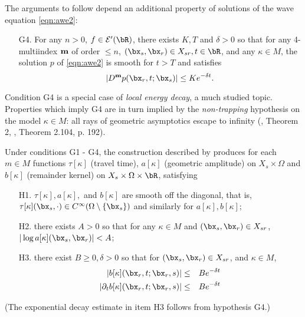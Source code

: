 The arguments to follow depend an additional property of solutions of
the wave equation \ref{eqn:awe2}:
\begin{itemize}
\item[G4. ] For any $n > 0$, $f \in {\cal E}'(\bR)$, there exists $K, T$ and $\delta>0$ so
  that for any 4-multiindex ${\bf m}$ of order $\le n$, $(\bx_s,\bx_r) \in
 X_{sr}, t \in \bR$,
  and any $\kappa \in M$, the solution $p$ of \ref{eqn:awe2} is smooth
  for $t>T$ and satisfies
  \[
    |D^{\bf m}p(\bx_r,t;\bx_s)| \le K e^{-\delta t}.
  \]
\end{itemize}
Condition G4 is a special case of {\em local energy decay}, a much
studied topic. Properties which imply G4 are in turn implied by the
{\em non-trapping} hypothesis on the model $\kappa \in M$: all rays of
geometric asymptotics escape to infinity (\cite{Hristova:09}, Theorem
2, \cite{EgorovShubin}, Theorem 2.104, p. 192).

Under conditions G1 - G4, the construction described by
\cite{Friedlander:75} produces for each $m \in M$ functions $\tau[\kappa]$ (travel time), $a[\kappa]$
(geometric amplitude) on $X_s \times \Omega$ and $b[\kappa]$
(remainder kernel) on $X_s \times \Omega \times \bR$, satisfying
\begin{itemize}
\item[H1. ] $\tau[\kappa], a[\kappa],$ and $b[\kappa]$ are smooth off the diagonal,
that is, $\tau[\kappa](\bx_s,\cdot) \in C^{\infty}(\Omega \setminus \{\bx_s\})$
and similarly for $a[\kappa],b[\kappa]$;
\item[H2. ] there exists $A>0$ so that for any $\kappa \in M$
  and $(\bx_s,\bx_r) \in X_{sr}$,
  $|\log a[\kappa](\bx_s,\bx_r)| < A$;
\item[H3. ] there exist $B \ge 0,\delta > 0$ so that for
$(\bx_s,\bx_r) \in X_{sr}$, and $\kappa \in
M$,
\begin{eqnarray}
  |b[\kappa](\bx_r,t;\bx_r,s)| &\le& B e^{-\delta t} \nonumber \\
  |\partial_t b[\kappa](\bx_r,t;\bx_r,s)| &\le& B e^{-\delta t}
  \label{eqn:best}
\end{eqnarray}
\end{itemize}
(The exponential decay estimate in item H3 follows from hypothesis G4.)

